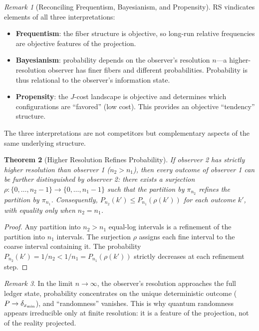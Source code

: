 \documentclass[12pt,a4paper]{article}
\newtheorem{theorem}{Theorem}[section]
\theoremstyle{definition}
\theoremstyle{remark}
\newtheorem{remark}[theorem]{Remark}
\begin{document}
\begin{remark}[Reconciling Frequentism, Bayesianism, and Propensity]
RS vindicates elements of all three interpretations:
\begin{itemize}[nosep]
  \item \textbf{Frequentism}: the fiber structure is objective, so
  long-run relative frequencies are objective features of the
  projection.
  \item \textbf{Bayesianism}: probability depends on the observer's
  resolution $n$---a higher-resolution observer has finer fibers and
  different probabilities.  Probability is thus relational to the
  observer's information state.
  \item \textbf{Propensity}: the $J$-cost landscape is objective and
  determines which configurations are ``favored'' (low cost).  This
  provides an objective ``tendency'' structure.
\end{itemize}
The three interpretations are not competitors but complementary aspects
of the same underlying structure.
\end{remark}

\begin{theorem}[Higher Resolution Refines Probability]
\label{thm:higher-res}
If observer 2 has strictly higher resolution than observer 1
($n_2 > n_1$), then every outcome of observer 1 can be further
distinguished by observer 2: there exists a surjection
$\rho : \{0,\ldots,n_2{-}1\} \to \{0,\ldots,n_1{-}1\}$ such that
the partition by $\pi_{n_2}$ refines the partition by $\pi_{n_1}$.
Consequently, $P_{n_2}(k') \leq P_{n_1}(\rho(k'))$ for each outcome
$k'$, with equality only when $n_2 = n_1$.
\end{theorem}

\begin{proof}
Any partition into $n_2 > n_1$ equal-log intervals is a refinement of
the partition into $n_1$ intervals.  The surjection $\rho$ assigns
each fine interval to the coarse interval containing it.  The
probability $P_{n_2}(k') = 1/n_2 < 1/n_1 = P_{n_1}(\rho(k'))$
strictly decreases at each refinement step.
\end{proof}

\begin{remark}
In the limit $n \to \infty$, the observer's resolution approaches the
full ledger state, probability concentrates on the unique deterministic
outcome ($P \to \delta_{x_{\rm min}}$), and ``randomness'' vanishes.
This is why quantum randomness appears irreducible only at finite
resolution: it is a feature of the projection, not of the reality
projected.
\end{remark}
\end{document}
